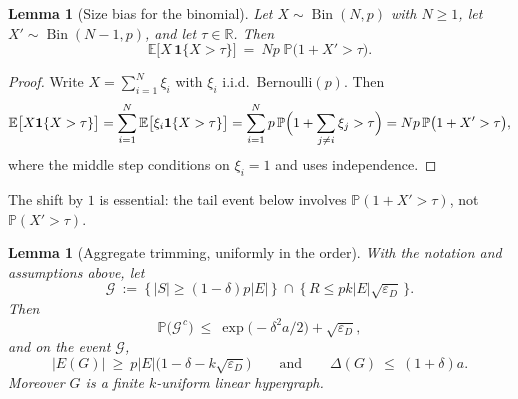 \documentclass[10pt,a4paper]{amsart}
\newtheorem{lemma}[theorem]{Lemma}
\newcommand{\EE}{E}
\newcommand{\PP}{\mathbb{P}}
\newcommand{\EX}{\mathbb{E}}
\newcommand{\Bin}{\operatorname{Bin}}
\newcommand{\Deltaop}{\Delta}
\begin{document}
\begin{lemma}[Size bias for the binomial]
\label{lem:sizebias}
Let $X\sim\Bin(N,p)$ with $N\ge1$, let $X'\sim\Bin(N-1,p)$, and let $\tau\in\mathbb{R}$.
Then
\[
  \EX\bigl[X\,\mathbf{1}\{X>\tau\}\bigr]\ =\ Np\;\PP\bigl(1+X'>\tau\bigr).
\]
\end{lemma}

\begin{proof}
Write $X=\sum_{i=1}^{N}\xi_i$ with $\xi_i$ i.i.d.\ Bernoulli$(p)$. Then
\[
  \EX\bigl[X\mathbf{1}\{X>\tau\}\bigr]
  =\sum_{i=1}^{N}\EX\bigl[\xi_i\mathbf{1}\{X>\tau\}\bigr]
  =\sum_{i=1}^{N}p\,\PP\Bigl(1+\sum_{j\ne i}\xi_j>\tau\Bigr)
  =Np\,\PP\bigl(1+X'>\tau\bigr),
\]
where the middle step conditions on $\xi_i=1$ and uses independence.
\end{proof}

The shift by $1$ is essential: the tail event below involves
$\PP(1+X'>\tau)$, not $\PP(X'>\tau)$.

\begin{lemma}[Aggregate trimming, uniformly in the order]
\label{lem:trim}
With the notation and assumptions above, let
\[
  \mathcal{G}\ :=\ \bigl\{\,|S|\ge(1-\delta)p|\EE|\,\bigr\}
    \ \cap\ \bigl\{\,R\le pk|\EE|\sqrt{\varepsilon_D}\,\bigr\}.
\]
Then
\[
  \PP\bigl(\mathcal{G}^{\,c}\bigr)\ \le\
  \exp\bigl(-\delta^2a/2\bigr)+\sqrt{\varepsilon_D},
\]
and on the event $\mathcal{G}$,
\[
  |E(G)|\ \ge\ p|\EE|\bigl(1-\delta-k\sqrt{\varepsilon_D}\bigr)
  \qquad\text{and}\qquad
  \Deltaop(G)\ \le\ (1+\delta)a .
\]
Moreover $G$ is a finite $k$-uniform linear hypergraph.
\end{lemma}
\end{document}
